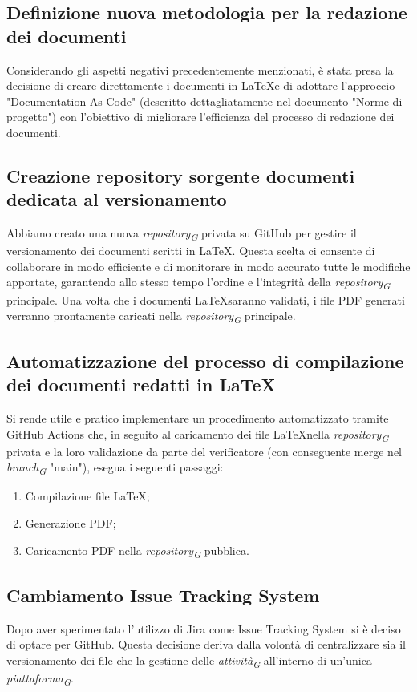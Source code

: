 \documentclass{article}
\begin{document}
    \subsection{Definizione nuova metodologia per la redazione dei documenti}
    Considerando gli aspetti negativi precedentemente menzionati, è stata presa la decisione di creare direttamente i documenti in \LaTeX e di adottare l'approccio "Documentation As Code" (descritto dettagliatamente nel documento "Norme di progetto") con l'obiettivo di migliorare l'efficienza del processo di redazione dei documenti.    
    \subsection{Creazione repository sorgente documenti dedicata al versionamento}
    Abbiamo creato una nuova \textit{repository}\textsubscript{\textit{G}} privata su GitHub per gestire il versionamento dei documenti scritti in \LaTeX. Questa scelta ci consente di collaborare in modo efficiente e di monitorare in modo accurato tutte le modifiche apportate, garantendo allo stesso tempo l'ordine e l'integrità della \textit{repository}\textsubscript{\textit{G}} principale. Una volta che i documenti \LaTeX saranno validati, i file PDF generati verranno prontamente caricati nella \textit{repository}\textsubscript{\textit{G}} principale.  

    \subsection{Automatizzazione del processo di compilazione dei documenti redatti in \LaTeX}
    Si rende utile e pratico implementare un procedimento automatizzato tramite GitHub Actions che, in seguito al caricamento dei file \LaTeX nella \textit{repository}\textsubscript{\textit{G}} privata e la loro validazione da parte del verificatore (con conseguente merge nel \textit{branch}\textsubscript{\textit{G}} "main"), esegua i seguenti passaggi:  
    \begin{enumerate}
        \item Compilazione file \LaTeX;
        \item Generazione PDF;
        \item Caricamento PDF nella \textit{repository}\textsubscript{\textit{G}} pubblica.       
    \end{enumerate}

    \subsection{Cambiamento Issue Tracking System}
    Dopo aver sperimentato l’utilizzo di Jira come Issue Tracking System si è deciso di optare per GitHub. Questa decisione deriva dalla volontà di centralizzare sia il versionamento dei file che la gestione delle \textit{attività}\textsubscript{\textit{G}} all'interno di un'unica \textit{piattaforma}\textsubscript{\textit{G}}.  
\end{document}
